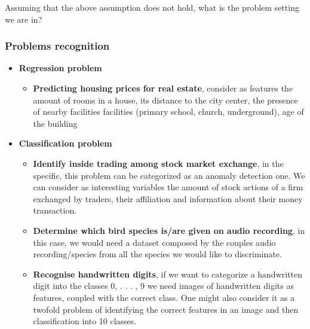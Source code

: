     Assuming that the above assumption does not hold, what is the problem setting we are in?


\subsubsection{Problems recognition}
    \begin{itemize}
        \item \textbf{Regression problem}
        \begin{itemize}
            \item \textbf{Predicting housing prices for real estate}, consider as features the amount of rooms in a house, its distance to the city center, the presence of nearby facilities facilities (primary school, church, underground), age of the building
        \end{itemize}
        \item \textbf{Classification problem}
        \begin{itemize}
            \item \textbf{Identify inside trading among stock market exchange}, in the specific, this problem can be categorized as an anomaly detection one. We can consider as interesting variables the amount of stock actions of a firm exchanged by traders, their affiliation and information
            about their money transaction.
            \item \textbf{Determine which bird species is/are given on audio recording}, in this case, we would need a dataset composed by the couples audio recording/species from all the species we would like to discriminate.
            \item \textbf{Recognise handwritten digits}, if we want to categorize a handwritten digit into the classes 0, . . . , 9 we need images of handwritten digits as features, coupled with the correct class. One might also consider it as a twofold problem of identifying the correct features in an image and then classification into 10 classes.
        \end{itemize}

\end{itemize}
